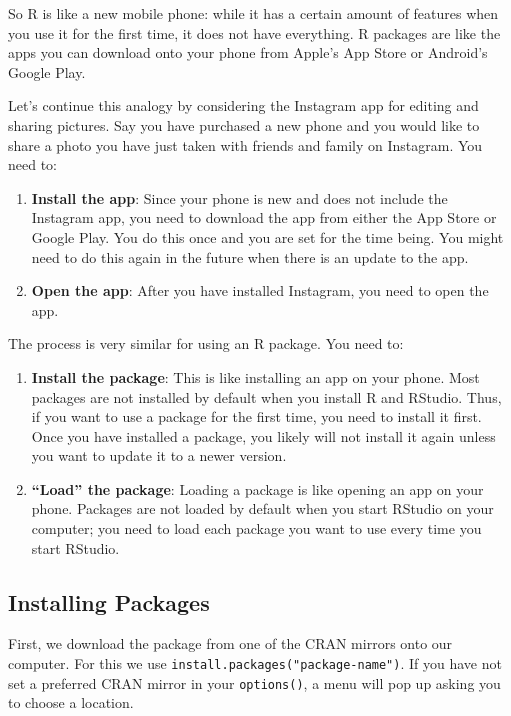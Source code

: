 \documentclass[
]{book}
\providecommand{\tightlist}{%
  \setlength{\itemsep}{0pt}\setlength{\parskip}{0pt}}
\begin{document}
So R is like a new mobile phone: while it has a certain amount of features when you use it for the first time, it does not have everything. R packages are like the apps you can download onto your phone from Apple's App Store or Android's Google Play.

Let's continue this analogy by considering the Instagram app for editing and sharing pictures. Say you have purchased a new phone and you would like to share a photo you have just taken with friends and family on Instagram. You need to:

\begin{enumerate}
\def\labelenumi{\arabic{enumi}.}
\tightlist
\item
  \textbf{Install the app}: Since your phone is new and does not include the Instagram app, you need to download the app from either the App Store or Google Play. You do this once and you are set for the time being. You might need to do this again in the future when there is an update to the app.
\item
  \textbf{Open the app}: After you have installed Instagram, you need to open the app.
\end{enumerate}

The process is very similar for using an R package. You need to:

\begin{enumerate}
\def\labelenumi{\arabic{enumi}.}
\tightlist
\item
  \textbf{Install the package}: This is like installing an app on your phone. Most packages are not installed by default when you install R and RStudio. Thus, if you want to use a package for the first time, you need to install it first. Once you have installed a package, you likely will not install it again unless you want to update it to a newer version.
\item
  \textbf{``Load'' the package}: Loading a package is like opening an app on your phone. Packages are not loaded by default when you start RStudio on your computer; you need to load each package you want to use every time you start RStudio.
\end{enumerate}

\hypertarget{installing-packages}{%
\subsection{Installing Packages}\label{installing-packages}}

First, we download the package from one of the CRAN mirrors onto our computer. For this we use \texttt{install.packages("package-name")}. If you have not set a preferred CRAN mirror in your \texttt{options()}, a menu will pop up asking you to choose a location.
\end{document}
